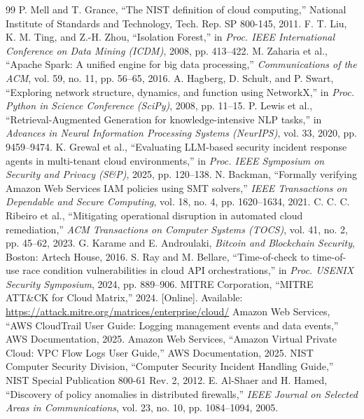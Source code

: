 \documentclass[12pt,a4paper]{report}
\begin{document}
\begin{thebibliography}{99}
 P. Mell and T. Grance, ``The NIST definition of cloud computing,'' National Institute of Standards and Technology, Tech. Rep. SP 800-145, 2011.
 F. T. Liu, K. M. Ting, and Z.-H. Zhou, ``Isolation Forest,'' in \textit{Proc. IEEE International Conference on Data Mining (ICDM)}, 2008, pp. 413--422.
 M. Zaharia et al., ``Apache Spark: A unified engine for big data processing,'' \textit{Communications of the ACM}, vol. 59, no. 11, pp. 56--65, 2016.
 A. Hagberg, D. Schult, and P. Swart, ``Exploring network structure, dynamics, and function using NetworkX,'' in \textit{Proc. Python in Science Conference (SciPy)}, 2008, pp. 11--15.
 P. Lewis et al., ``Retrieval-Augmented Generation for knowledge-intensive NLP tasks,'' in \textit{Advances in Neural Information Processing Systems (NeurIPS)}, vol. 33, 2020, pp. 9459--9474.
 K. Grewal et al., ``Evaluating LLM-based security incident response agents in multi-tenant cloud environments,'' in \textit{Proc. IEEE Symposium on Security and Privacy (S\&P)}, 2025, pp. 120--138.
 N. Backman, ``Formally verifying Amazon Web Services IAM policies using SMT solvers,'' \textit{IEEE Transactions on Dependable and Secure Computing}, vol. 18, no. 4, pp. 1620--1634, 2021.
 C. C. C. Ribeiro et al., ``Mitigating operational disruption in automated cloud remediation,'' \textit{ACM Transactions on Computer Systems (TOCS)}, vol. 41, no. 2, pp. 45--62, 2023.
 G. Karame and E. Androulaki, \textit{Bitcoin and Blockchain Security}, Boston: Artech House, 2016.
 S. Ray and M. Bellare, ``Time-of-check to time-of-use race condition vulnerabilities in cloud API orchestrations,'' in \textit{Proc. USENIX Security Symposium}, 2024, pp. 889--906.
 MITRE Corporation, ``MITRE ATT\&CK for Cloud Matrix,'' 2024. [Online]. Available: \url{https://attack.mitre.org/matrices/enterprise/cloud/}
 Amazon Web Services, ``AWS CloudTrail User Guide: Logging management events and data events,'' AWS Documentation, 2025.
 Amazon Web Services, ``Amazon Virtual Private Cloud: VPC Flow Logs User Guide,'' AWS Documentation, 2025.
 NIST Computer Security Division, ``Computer Security Incident Handling Guide,'' NIST Special Publication 800-61 Rev. 2, 2012.
 E. Al-Shaer and H. Hamed, ``Discovery of policy anomalies in distributed firewalls,'' \textit{IEEE Journal on Selected Areas in Communications}, vol. 23, no. 10, pp. 1084--1094, 2005.
\end{thebibliography}
\end{document}
